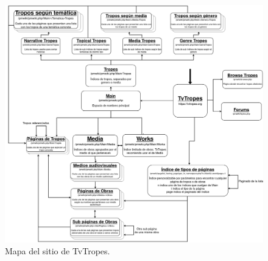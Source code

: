 \begin{figure}[!h]
  \centering
  \includegraphics[width=\textwidth]{img/sitemap.png}
  \caption{Mapa del sitio de TvTropes.}
  \label{fig:sitemap}
\end{figure}

